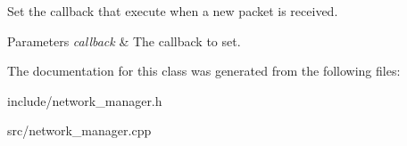 Set the callback that execute when a new packet is received. 


\begin{DoxyParams}{Parameters}
{\em callback} & The callback to set. \\
\hline
\end{DoxyParams}


The documentation for this class was generated from the following files\+:\begin{DoxyCompactItemize}
\item 
include/network\+\_\+manager.\+h\item 
src/network\+\_\+manager.\+cpp\end{DoxyCompactItemize}
